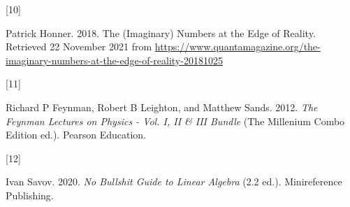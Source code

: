 \documentclass[
  a4paper,
]{article}
\newlength{\cslhangindent}
\newlength{\csllabelwidth}
\newlength{\cslentryspacingunit} %
\newenvironment{CSLReferences}[2] %
 {%
  \setlength{\parindent}{0pt}
  \ifodd #1
  \let\oldpar\par
  \def\par{\hangindent=\cslhangindent\oldpar}
  \fi
  \setlength{\parskip}{#2\cslentryspacingunit}
 }%
 {}
\newcommand{\CSLLeftMargin}[1]{\parbox[t]{\csllabelwidth}{#1}}
\newcommand{\CSLRightInline}[1]{\parbox[t]{\linewidth - \csllabelwidth}{#1}\break}
\begin{document}
\begin{CSLReferences}{0}{0}
\leavevmode{}%
\CSLLeftMargin{{[}10{]} }%
\CSLRightInline{Patrick Honner. 2018. {The (Imaginary) Numbers at the
Edge of Reality}. Retrieved 22 November 2021 from
\url{https://www.quantamagazine.org/the-imaginary-numbers-at-the-edge-of-reality-20181025}}

\leavevmode{}%
\CSLLeftMargin{{[}11{]} }%
\CSLRightInline{Richard P Feynman, Robert B Leighton, and Matthew Sands.
2012. \emph{{The Feynman Lectures on Physics - Vol. I, II \& III
Bundle}} (The Millenium Combo Edition ed.). Pearson Education.}

\leavevmode{}%
\CSLLeftMargin{{[}12{]} }%
\CSLRightInline{Ivan Savov. 2020. \emph{{No Bullshit Guide to Linear
Algebra}} (2.2 ed.). Minireference Publishing.}

\end{CSLReferences}
\end{document}
